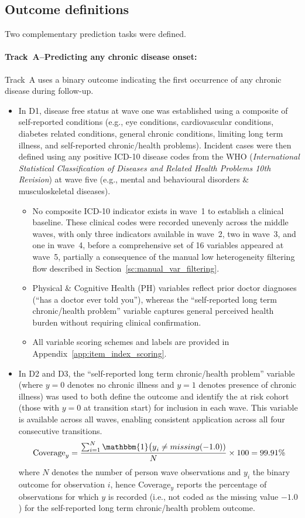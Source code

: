 \subsection{Outcome definitions}
Two complementary prediction tasks were defined.

\paragraph{Track~A--Predicting any chronic disease onset:}\label{sc:track_a}
Track~A uses a binary outcome indicating the first occurrence of any chronic disease during follow-up.
\begin{itemize}
    \item In D1, disease free status at wave one was established using a composite of self-reported conditions (e.g., eye conditions, cardiovascular conditions, diabetes related conditions, general chronic conditions, limiting long term illness, and self-reported chronic/health problems). Incident cases were then defined using any positive ICD-10 disease codes from the \gls{WHO} (\emph{International Statistical Classification of Diseases and Related Health Problems 10th Revision}) at wave five (e.g., mental and behavioural disorders \& musculoskeletal diseases).
		\begin{itemize}
            \item No composite ICD-10 indicator exists in wave~1 to establish a clinical baseline. These clinical codes were recorded unevenly across the middle waves, with only three indicators available in wave~2, two in wave~3, and one in wave~4, before a comprehensive set of 16 variables appeared at wave~5, partially a consequence of the manual low heterogeneity filtering flow described in Section~\ref{sc:manual_var_filtering}.
			\item Physical \& Cognitive Health (PH) variables reflect prior doctor diagnoses (``has a doctor ever told you''), whereas the ``self-reported long term chronic/health problem'' variable captures general perceived health burden without requiring clinical confirmation.
            \item All variable scoring schemes and labels are provided in Appendix~\ref{app:item_index_scoring}.
    	\end{itemize}
    \item In D2 and D3, the ``self-reported long term chronic/health problem'' variable (where $y=0$ denotes no chronic illness and $y=1$ denotes presence of chronic illness) was used to both define the outcome and identify the at risk cohort (those with $y=0$ at transition start) for inclusion in each wave. This variable is available across all waves, enabling consistent application across all four consecutive transitions.\ \[\text{Coverage}_{\text{$y$}} = \frac{\sum_{i=1}^{N} \mathbbm{1}\big(\text{$y$}_{i} \neq missing(-1.0))}{N} \times 100 = 99.91\%\] \noindent where $N$ denotes the number of person wave observations and $y_{i}$ the binary outcome for observation $i$, hence Coverage$_{y}$ reports the percentage of observations for which $y$ is recorded (i.e., not coded as the missing value $-1.0$) for the self-reported long term chronic/health problem outcome.

\end{itemize}
